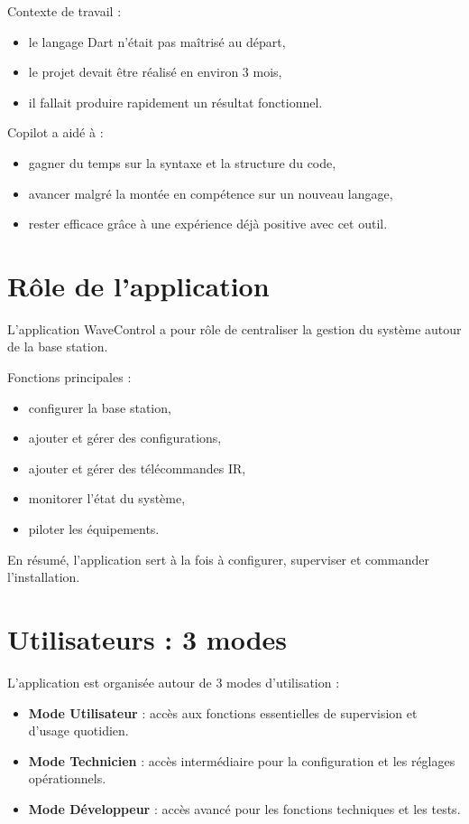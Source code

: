\documentclass[12pt,a4paper]{report}
\begin{document}
Contexte de travail :
\begin{itemize}[leftmargin=*]
  \item le langage Dart n’était pas maîtrisé au départ,
  \item le projet devait être réalisé en environ 3 mois,
  \item il fallait produire rapidement un résultat fonctionnel.
\end{itemize}

Copilot a aidé à :
\begin{itemize}[leftmargin=*]
  \item gagner du temps sur la syntaxe et la structure du code,
  \item avancer malgré la montée en compétence sur un nouveau langage,
  \item rester efficace grâce à une expérience déjà positive avec cet outil.
\end{itemize}

\chapter{Rôle de l’application}

L’application WaveControl a pour rôle de centraliser la gestion du système autour de la base station.

Fonctions principales :
\begin{itemize}[leftmargin=*]
  \item configurer la base station,
  \item ajouter et gérer des configurations,
  \item ajouter et gérer des télécommandes IR,
  \item monitorer l’état du système,
  \item piloter les équipements.
\end{itemize}

En résumé, l’application sert à la fois à configurer, superviser et commander l’installation.

\chapter{Utilisateurs : 3 modes}

L’application est organisée autour de 3 modes d’utilisation :
\begin{itemize}[leftmargin=*]
  \item \textbf{Mode Utilisateur} : accès aux fonctions essentielles de supervision et d’usage quotidien.
  \item \textbf{Mode Technicien} : accès intermédiaire pour la configuration et les réglages opérationnels.
  \item \textbf{Mode Développeur} : accès avancé pour les fonctions techniques et les tests.
\end{itemize}
\end{document}
